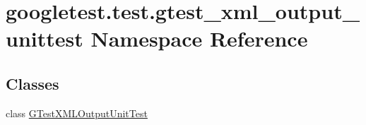 \hypertarget{namespacegoogletest_1_1test_1_1gtest__xml__output__unittest}{}\section{googletest.\+test.\+gtest\+\_\+xml\+\_\+output\+\_\+unittest Namespace Reference}
\label{namespacegoogletest_1_1test_1_1gtest__xml__output__unittest}
\subsection*{Classes}
\begin{DoxyCompactItemize}
\item 
class \mbox{\hyperlink{classgoogletest_1_1test_1_1gtest__xml__output__unittest_1_1_g_test_x_m_l_output_unit_test}{G\+Test\+X\+M\+L\+Output\+Unit\+Test}}
\end{DoxyCompactItemize}

